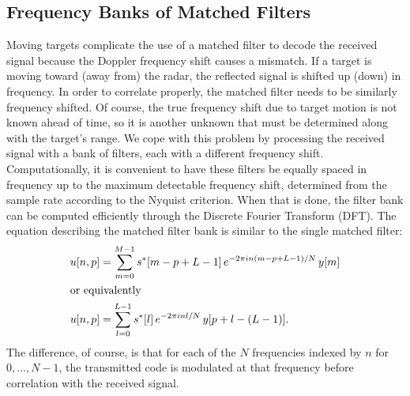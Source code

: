 \subsection{Frequency Banks of Matched Filters}
Moving targets complicate the use of a matched filter to decode the received signal because the Doppler frequency shift causes a mismatch. If a target is moving toward (away from) the radar, the reflected signal is shifted up (down) in frequency. In order to correlate properly, the matched filter needs to be similarly frequency shifted. Of course, the true frequency shift due to target motion is not known ahead of time, so it is another unknown that must be determined along with the target's range. We cope with this problem by processing the received signal with a bank of filters, each with a different frequency shift. Computationally, it is convenient to have these filters be equally spaced in frequency up to the maximum detectable frequency shift, determined from the sample rate according to the Nyquist criterion. When that is done, the filter bank can be computed efficiently through the Discrete Fourier Transform (DFT). The equation describing the matched filter bank is similar to the single matched filter:
\begin{align}
 u[n,p] &= \sum_{m=0}^{M-1} s^*[m - p + L-1]\, e^{-2\pi i n (m-p+L-1)/N}\, y[m]\\
 \intertext{or equivalently}
 u[n,p] &= \sum_{l=0}^{L-1} s^*[l]\, e^{-2\pi i n l / N}\, y[p + l - (L-1)].
\end{align}
The difference, of course, is that for each of the $N$ frequencies indexed by $n$ for $0,\dotsc,N-1$, the transmitted code is modulated at that frequency before correlation with the received signal.

